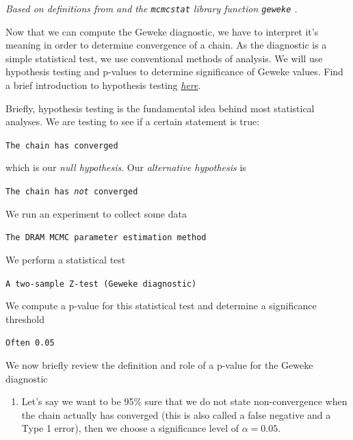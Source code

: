 \begin{appendices}
\begin{tcolorbox}
\textit{Based on definitions from \cite{convergediganosticRoy2020} and the \texttt{mcmcstat} library function \texttt{geweke} \cite{mcmcstatlib}.}
\end{tcolorbox}
\vspace{3mm}
\par Now that we can compute the Geweke diagnostic, we have to interpret it's meaning in order to determine convergence of a chain. As the diagnostic is a simple statistical test, we use conventional methods of analysis. We will use hypothesis testing and p-values to determine significance of Geweke values. Find a brief introduction to hypothesis testing \textit{\href{https://www.statisticshowto.com/probability-and-statistics/hypothesis-testing/}{here}}.\\

\begin{tcolorbox}[colback=red!5,colframe=red!75!black,title=\textbf{Hypothesis Testing}]
Briefly, hypothesis testing is the fundamental idea behind most statistical analyses. We are testing to see if a certain statement is true:
\begin{center}
    \texttt{The chain has converged}
\end{center}
which is our \textit{null hypothesis}. Our \textit{alternative hypothesis} is
\begin{center}
    \texttt{The chain has \textit{not} converged}
\end{center}
We run an experiment to collect some data
\begin{center}
    \texttt{The DRAM MCMC parameter estimation method}
\end{center}
We perform a statistical test
\begin{center}
    \texttt{A two-sample Z-test (Geweke diagnostic)}
\end{center}
We compute a p-value for this statistical test and determine a significance threshold
\begin{center}
    \texttt{Often 0.05}
\end{center}
\end{tcolorbox}
\vspace{3mm}
\par We now briefly review the definition and role of a p-value for the Geweke diagnostic
\begin{tcolorbox}[colback=blue!10,colframe=blue!25!black,title=\textbf{Calculating p-values}]
\begin{enumerate}
    \item Let's say we want to be 95\% sure that we do not state non-convergence when the chain actually has converged (this is also called a false negative and a Type 1 error), then we choose a significance level of $\alpha = 0.05$. 

\end{enumerate}
\end{tcolorbox}
\end{appendices}
